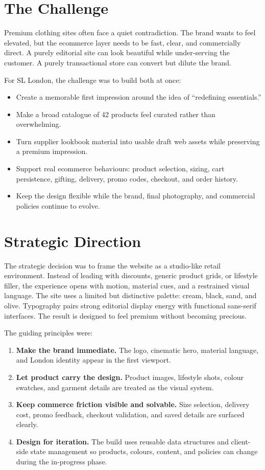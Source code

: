 \documentclass[11pt,a4paper]{article}
\newcommand{\project}{SL London}
\begin{document}
\section{The Challenge}

Premium clothing sites often face a quiet contradiction. The brand wants to feel elevated, but the ecommerce layer needs to be fast, clear, and commercially direct. A purely editorial site can look beautiful while under-serving the customer. A purely transactional store can convert but dilute the brand.

For \project{}, the challenge was to build both at once:

\begin{itemize}
    \item Create a memorable first impression around the idea of ``redefining essentials.''
    \item Make a broad catalogue of 42 products feel curated rather than overwhelming.
    \item Turn supplier lookbook material into usable draft web assets while preserving a premium impression.
    \item Support real ecommerce behaviours: product selection, sizing, cart persistence, gifting, delivery, promo codes, checkout, and order history.
    \item Keep the design flexible while the brand, final photography, and commercial policies continue to evolve.
\end{itemize}

\section{Strategic Direction}

The strategic decision was to frame the website as a studio-like retail environment. Instead of leading with discounts, generic product grids, or lifestyle filler, the experience opens with motion, material cues, and a restrained visual language. The site uses a limited but distinctive palette: cream, black, sand, and olive. Typography pairs strong editorial display energy with functional sans-serif interfaces. The result is designed to feel premium without becoming precious.

The guiding principles were:

\begin{enumerate}
    \item \textbf{Make the brand immediate.} The logo, cinematic hero, material language, and London identity appear in the first viewport.
    \item \textbf{Let product carry the design.} Product images, lifestyle shots, colour swatches, and garment details are treated as the visual system.
    \item \textbf{Keep commerce friction visible and solvable.} Size selection, delivery cost, promo feedback, checkout validation, and saved details are surfaced clearly.
    \item \textbf{Design for iteration.} The build uses reusable data structures and client-side state management so products, colours, content, and policies can change during the in-progress phase.
\end{enumerate}
\end{document}
